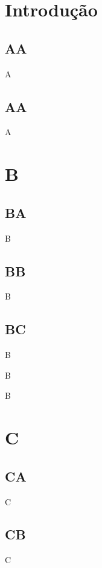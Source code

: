 \documentclass{beamer}
\begin{document}
\section{Introdução}
\subsection{AA}
\begin{frame}A\end{frame}

\subsection{AA}
\begin{frame}A\end{frame}

\section{B}
\subsection{BA}
\begin{frame}B\end{frame}
\subsection{BB}
\begin{frame}B\end{frame}
\subsection{BC}
\begin{frame}B\end{frame}
\begin{frame}B\end{frame}
\begin{frame}B\end{frame}


\section{C}
\subsection{CA}
\begin{frame}C\end{frame}
\subsection{CB}
\begin{frame}C\end{frame}
\end{document}
